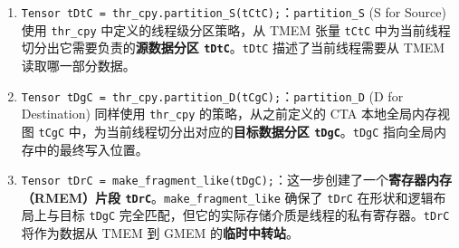 \begin{enumerate}
\item \texttt{T\allowbreak{}e\allowbreak{}n\allowbreak{}s\allowbreak{}o\allowbreak{}r\allowbreak{} \allowbreak{}t\allowbreak{}D\allowbreak{}t\allowbreak{}C\allowbreak{} \allowbreak{}=\allowbreak{} \allowbreak{}t\allowbreak{}h\allowbreak{}r\allowbreak{}\_\allowbreak{}c\allowbreak{}p\allowbreak{}y\allowbreak{}.\allowbreak{}p\allowbreak{}a\allowbreak{}r\allowbreak{}t\allowbreak{}i\allowbreak{}t\allowbreak{}i\allowbreak{}o\allowbreak{}n\allowbreak{}\_\allowbreak{}S\allowbreak{}(\allowbreak{}t\allowbreak{}C\allowbreak{}t\allowbreak{}C\allowbreak{})\allowbreak{};}：\texttt{partition\_\allowbreak{}S} (S for Source) 使用 \texttt{thr\_\allowbreak{}cpy} 中定义的线程级分区策略，从 TMEM 张量 \texttt{t\allowbreak{}Ct\allowbreak{}C} 中为当前线程切分出它需要负责的\textbf{源数据分区 \texttt{t\allowbreak{}Dt\allowbreak{}C}}。\texttt{t\allowbreak{}Dt\allowbreak{}C} 描述了当前线程需要从 TMEM 读取哪一部分数据。
\item \texttt{T\allowbreak{}e\allowbreak{}n\allowbreak{}s\allowbreak{}o\allowbreak{}r\allowbreak{} \allowbreak{}t\allowbreak{}D\allowbreak{}g\allowbreak{}C\allowbreak{} \allowbreak{}=\allowbreak{} \allowbreak{}t\allowbreak{}h\allowbreak{}r\allowbreak{}\_\allowbreak{}c\allowbreak{}p\allowbreak{}y\allowbreak{}.\allowbreak{}p\allowbreak{}a\allowbreak{}r\allowbreak{}t\allowbreak{}i\allowbreak{}t\allowbreak{}i\allowbreak{}o\allowbreak{}n\allowbreak{}\_\allowbreak{}D\allowbreak{}(\allowbreak{}t\allowbreak{}C\allowbreak{}g\allowbreak{}C\allowbreak{})\allowbreak{};}：\texttt{partition\_\allowbreak{}D} (D for Destination) 同样使用 \texttt{thr\_\allowbreak{}cpy} 的策略，从之前定义的 CTA 本地全局内存视图 \texttt{t\allowbreak{}Cg\allowbreak{}C} 中，为当前线程切分出对应的\textbf{目标数据分区 \texttt{t\allowbreak{}Dg\allowbreak{}C}}。\texttt{t\allowbreak{}Dg\allowbreak{}C} 指向全局内存中的最终写入位置。
\item \texttt{T\allowbreak{}e\allowbreak{}n\allowbreak{}s\allowbreak{}o\allowbreak{}r\allowbreak{} \allowbreak{}t\allowbreak{}D\allowbreak{}r\allowbreak{}C\allowbreak{} \allowbreak{}=\allowbreak{} \allowbreak{}m\allowbreak{}a\allowbreak{}k\allowbreak{}e\allowbreak{}\_\allowbreak{}f\allowbreak{}r\allowbreak{}a\allowbreak{}g\allowbreak{}m\allowbreak{}e\allowbreak{}n\allowbreak{}t\allowbreak{}\_\allowbreak{}l\allowbreak{}i\allowbreak{}k\allowbreak{}e\allowbreak{}(\allowbreak{}t\allowbreak{}D\allowbreak{}g\allowbreak{}C\allowbreak{})\allowbreak{};}：这一步创建了一个\textbf{寄存器内存（RMEM）片段 \texttt{t\allowbreak{}Dr\allowbreak{}C}}。\texttt{make\_\allowbreak{}fragment\_\allowbreak{}like} 确保了 \texttt{t\allowbreak{}Dr\allowbreak{}C} 在形状和逻辑布局上与目标 \texttt{t\allowbreak{}Dg\allowbreak{}C} 完全匹配，但它的实际存储介质是线程的私有寄存器。\texttt{t\allowbreak{}Dr\allowbreak{}C} 将作为数据从 TMEM 到 GMEM 的\textbf{临时中转站}。
\end{enumerate}

